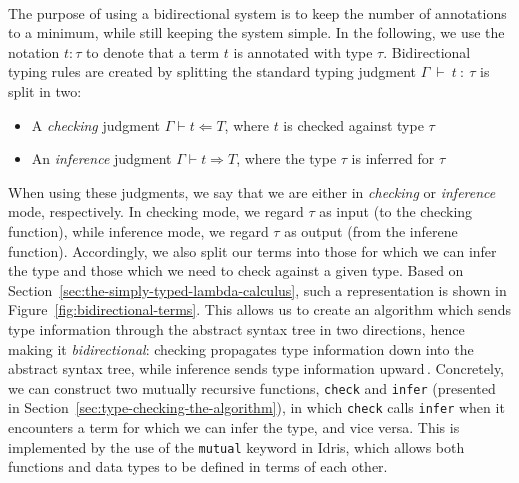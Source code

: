 \paragraph{}
The purpose of using a bidirectional system is to keep the number of annotations to a minimum, while still keeping the system simple. In the following, we use the notation $t : \tau$ to denote that a term $t$ is annotated with type $\tau$. Bidirectional typing rules are created by splitting the standard typing judgment $\Gamma~\vdash~t~:~\tau$ is split in two:

\begin{itemize}
\item A \emph{checking} judgment $\Gamma \vdash t \Leftarrow T$, where $t$ is checked against type $\tau$
\item An \emph{inference} judgment $\Gamma \vdash t \Rightarrow T$, where the type $\tau$ is inferred for $\tau$
\end{itemize}

When using these judgments, we say that we are either in \emph{checking} or \emph{inference} mode, respectively. In checking mode, we regard $\tau$ as input (to the checking function), while inference mode, we regard $\tau$ as output (from the inferene function). Accordingly, we also split our terms into those for which we can infer the type and those which we need to check against a given type. Based on Section~\ref{sec:the-simply-typed-lambda-calculus}, such a representation is shown in Figure~\ref{fig:bidirectional-terms}. This allows us to create an algorithm which sends type information through the abstract syntax tree in two directions, hence making it \emph{bidirectional}: checking propagates type information down into the abstract syntax tree, while inference sends type information upward\,\cite{Pfenning:bidirectional}. Concretely, we can construct two mutually recursive functions, \texttt{check} and \texttt{infer} (presented in Section~\ref{sec:type-checking-the-algorithm}), in which \texttt{check} calls \texttt{infer} when it encounters a term for which we can infer the type, and vice versa. This is implemented by the use of the \texttt{mutual} keyword in Idris, which allows both functions and data types to be defined in terms of each other.

